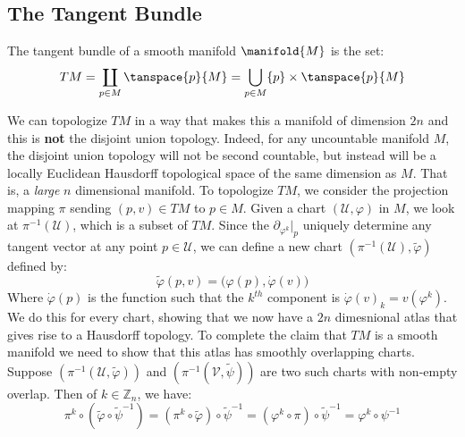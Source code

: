 \documentclass{article}                                                        %
\begin{document}
        \subsection{The Tangent Bundle}
            \begin{definition}
                The tangent bundle of a smooth manifold $\manifold{M}$ is the
                set:
                \begin{equation}
                    TM=\coprod_{p\in{M}}\tanspace{p}{M}
                        =\bigcup_{p\in{M}}\{p\}\times\tanspace{p}{M}
                \end{equation}
            \end{definition}
            We can topologize $TM$ in a way that makes this a manifold of
            dimension $2n$ and this is \textbf{not} the disjoint union topology.
            Indeed, for any uncountable manifold $M$, the disjoint union
            topology will not be second countable, but instead will be a
            locally Euclidean Hausdorff topological space of the same dimension
            as $M$. That is, a \textit{large} $n$ dimensional manifold. To
            topologize $TM$, we consider the projection mapping $\pi$ sending
            $(p,v)\in{TM}$ to $p\in{M}$. Given a chart $(\mathcal{U},\varphi)$
            in $M$, we look at $\pi^{\minus{1}}(\mathcal{U})$, which is a
            subset of $TM$. Since the $\partial_{\varphi^{k}}|_{p}$ uniquely
            determine any tangent vector at any point $p\in\mathcal{U}$, we can
            define a new chart $(\pi^{\minus{1}}(\mathcal{U}),\tilde{\varphi})$
            defined by:
            \begin{equation}
                \tilde{\varphi}(p,v)=\big(\varphi(p),\dot{\varphi}(v)\big)
            \end{equation}
            Where $\dot{\varphi}(p)$ is the function such that the $k^{th}$
            component is $\dot{\varphi}(v)_{k}=v(\varphi^{k})$. We do this for
            every chart, showing that we now have a $2n$ dimesnional atlas that
            gives rise to a Hausdorff topology. To complete the claim that $TM$
            is a smooth manifold we need to show that this atlas has smoothly
            overlapping charts. Suppose
            $(\pi^{\minus{1}}(\mathcal{U},\tilde{\varphi}))$ and
            $(\pi^{\minus{1}}(\mathcal{V},\tilde{\psi}))$ are two such charts
            with non-empty overlap. Then of $k\in\mathbb{Z}_{n}$, we have:
            \begin{equation}
                \pi^{k}\circ(\tilde{\varphi}\circ\tilde{\psi}^{\minus{1}})
                =(\pi^{k}\circ\tilde{\varphi})\circ\tilde{\psi}^{\minus{1}}
                =(\varphi^{k}\circ\pi)\circ\tilde{\psi}^{\minus{1}}
                =\varphi^{k}\circ\psi^{\minus{1}}
            \end{equation}
\end{document}
